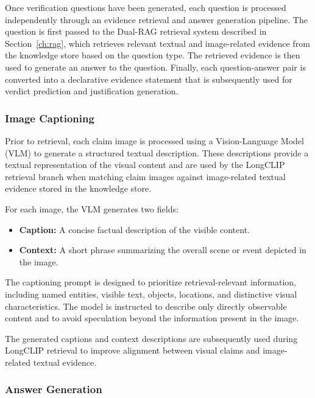 Once verification questions have been generated, each question is processed independently through an evidence retrieval and answer generation pipeline. The question is first passed to the Dual-RAG retrieval system described in Section~\ref{ch:rag}, which retrieves relevant textual and image-related evidence from the knowledge store based on the question type. The retrieved evidence is then used to generate an answer to the question. Finally, each question-answer pair is converted into a declarative evidence statement that is subsequently used for verdict prediction and justification generation.

\subsubsection{Image Captioning}
\label{subsection:caption}

Prior to retrieval, each claim image is processed using a Vision-Language Model (VLM) to generate a structured textual description. These descriptions provide a textual representation of the visual content and are used by the LongCLIP retrieval branch when matching claim images against image-related textual evidence stored in the knowledge store.

For each image, the VLM generates two fields:

\begin{itemize}
\item \textbf{Caption:} A concise factual description of the visible content.
\item \textbf{Context:} A short phrase summarizing the overall scene or event depicted in the image.
\end{itemize}

The captioning prompt is designed to prioritize retrieval-relevant information, including named entities, visible text, objects, locations, and distinctive visual characteristics. The model is instructed to describe only directly observable content and to avoid speculation beyond the information present in the image.

The generated captions and context descriptions are subsequently used during LongCLIP retrieval to improve alignment between visual claims and image-related textual evidence.

\subsubsection{Answer Generation}

